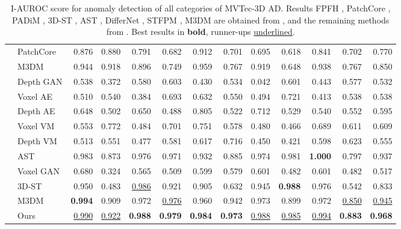 \begin{table}[ht]
\begin{tabular}{cl|r|r|r|r|r|r|r|r|r|r|r}
& PatchCore & 0.876 & 0.880 & 0.791 & 0.682 & 0.912 & 0.701 & 0.695 & 0.618  & 0.841 & 0.702 & 0.770 \\
& M3DM & 0.944 & 0.918 & 0.896 & 0.749 & 0.959 & 0.767 & 0.919 & 0.648 & 0.938 & 0.767 & 0.850 \\
\hline
\parbox[t]{0.5mm}{} & Depth GAN & 0.538 & 0.372 & 0.580 & 0.603 & 0.430 & 0.534 & 0.042 & 0.601 & 0.443 & 0.577 & 0.532 \\
& Voxel AE & 0.510 & 0.540 & 0.384 & 0.693 & 0.632 & 0.550 & 0.494 & 0.721 & 0.413 & 0.538 & 0.538 \\
& Depth AE & 0.648 & 0.502 & 0.650 & 0.488 & 0.805 & 0.522 & 0.712 & 0.529 & 0.540 & 0.552 & 0.595 \\
& Voxel VM & 0.553 & 0.772 & 0.484 & 0.701 & 0.751 & 0.578 & 0.480 & 0.466 & 0.689 & 0.611 & 0.609 \\
& Depth VM & 0.513 & 0.551 & 0.477 & 0.581 & 0.617 & 0.716 & 0.450 & 0.421 & 0.598 & 0.623 & 0.555 \\
& AST & 0.983 & 0.873 & 0.976 & 0.971 & 0.932 & 0.885 & 0.974 & 0.981 & \textbf{1.000} & 0.797 & 0.937 \\
& Voxel GAN & 0.680 & 0.324 & 0.565 & 0.509 & 0.599 & 0.579 & 0.601 & 0.482 & 0.601 & 0.482 & 0.517 \\
& 3D-ST & 0.950 & 0.483 & \underline{0.986} & 0.921 & 0.905 & 0.632 & 0.945 & \textbf{0.988} & 0.976 & 0.542 & 0.833 \\
& M3DM & \textbf{0.994} & 0.909 & 0.972 & \underline{0.976} & 0.960 & 0.942 & 0.973 & 0.899 & 0.972 & \underline{0.850} & \underline{0.945} \\
& Ours & \underline{0.990} & \underline{0.922} & \textbf{0.988} & \textbf{0.979} & \textbf{0.984} & \textbf{0.973} & \underline{0.988} & \underline{0.985} & \underline{0.994} & \textbf{0.883} & \textbf{0.968} \\
\hline
\end{tabular}
\caption{\label{tab:1} I-AUROC score for anomaly detection of all categories of MVTec-3D AD. Results FPFH \cite{horwitz2022empirical}, PatchCore \cite{roth2022towards}, PADiM \cite{defard2021padim}, 3D-ST \cite{bergmann2023anomaly}, AST \cite{rudolph2023asymmetric}, DifferNet \cite{rudolph2021same}, STFPM \cite{wang2021student}, M3DM \cite{wang2023multimodal} are obtained from \cite{wang2023multimodal}, and the remaining methods from \cite{bergmann2022mvtec}. Best results in \textbf{bold}, runner-ups \underline{underlined}.}
\end{table}

